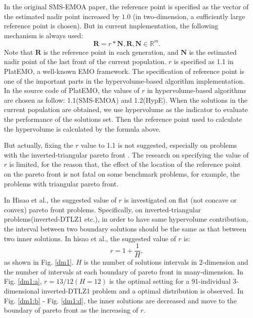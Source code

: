 \documentclass[conference]{IEEEtran}
\begin{document}
In the original SMS-EMOA\cite{smsemoa} paper, 
the reference point is specified as the vector of the estimated nadir point increased by $\boldsymbol{1.0}$
(in two-dimension, a sufficiently large reference point is chosen). 
But in current implementation, the following mechanism is always used:
\begin{equation}\label{frpa1}
  \boldsymbol R = r * \boldsymbol N, 
  \boldsymbol R, \boldsymbol N \in \mathbb{R}^m.
\end{equation}
Note that $\boldsymbol R$ is the reference point in each generation, 
and $\boldsymbol N$ is the estimated nadir point of the last front of the current population. 
$r$ is specified as 1.1 in PlatEMO\cite{PlatEMO}, a well-known EMO framework. 
The specification of reference point is one of the important parts in the hypervolume-based algorithm implementation.
In the source code of PlatEMO, the values of $r$ in hypervolume-based algorithms are chosen as follow: 
1.1(SMS-EMOA\cite{smsemoa}) and 1.2(HypE\cite{HypE}). %
When the solutions in the current population are obtained, 
we use hypervolume as the indicator to evaluate the performance of the solutions set. 
Then the reference point used to calculate the hypervolume is calculated by the formula above. 

But actually, fixing the $r$ value to 1.1 is not suggested, especially on problems with the inverted-triangular pareto front
\cite{hisao:RPhowtoSpecify}. 
The research on specifying the value of $r$ is limited, for the reason that, 
the effect of the location of the reference point on the pareto front 
is not fatal on some benchmark problems, for example, the problems with triangular pareto front. 

%
In Hisao et al.\cite{hisao:RPexplanation, hisao:RPhowtoSpecify, hisao:RPspecify}, the suggested value of $r$ is investigated 
on flat (not concave or convex) pareto front problems. 
Specifically, on inverted-triangular problems(inverted-DTLZ1\cite{hisao:RPexplanation} etc.), 
in order to have same hypervolume contribution, 
the interval between two boundary solutions should be the same as that between two inner solutions.
In hisao et al.\cite{hisao:RPhowtoSpecify}, the suggested value of $r$ is:
\begin{equation}\label{eod}
  r=1+\frac{1}{H},
\end{equation}
as shown in Fig. \ref{dm1}. $H$ is the number of solutions intervals in 2-dimension 
and the number of intervals at each boundary of pareto front in many-dimension. 
In Fig. \ref{dm1:a}, $r=13/12(H=12)$ is the optimal setting for a 91-individual 3-dimensional 
inverted-DTLZ1 problem and a optimal distribution is observed. 
In Fig. \ref{dm1:b} - Fig. \ref{dm1:d}, the inner solutions are decreased and move to 
the boundary of pareto front as the increasing of $r$. 
\end{document}
